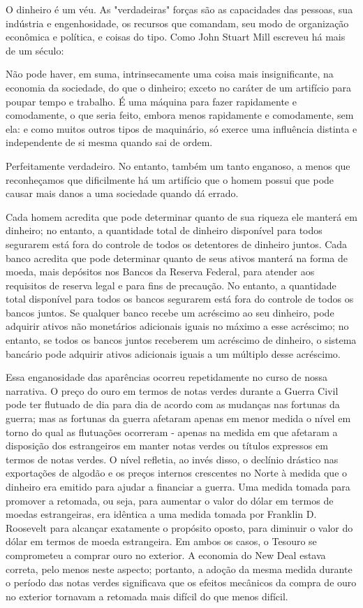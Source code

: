 \documentclass[12pt]{article}
\begin{document}
O dinheiro é um véu. As "verdadeiras" forças são as capacidades das pessoas, sua indústria e engenhosidade, os recursos que comandam, seu modo de organização econômica e política, e coisas do tipo. Como John Stuart Mill escreveu há mais de um século:

Não pode haver, em suma, intrinsecamente uma coisa mais insignificante, na economia da sociedade, do que o dinheiro; exceto no caráter de um artifício para poupar tempo e trabalho. É uma máquina para fazer rapidamente e comodamente, o que seria feito, embora menos rapidamente e comodamente, sem ela: e como muitos outros tipos de maquinário, só exerce uma influência distinta e independente de si mesma quando sai de ordem.

Perfeitamente verdadeiro. No entanto, também um tanto enganoso, a menos que reconheçamos que dificilmente há um artifício que o homem possui que pode causar mais danos a uma sociedade quando dá errado.

Cada homem acredita que pode determinar quanto de sua riqueza ele manterá em dinheiro; no entanto, a quantidade total de dinheiro disponível para todos segurarem está fora do controle de todos os detentores de dinheiro juntos. Cada banco acredita que pode determinar quanto de seus ativos manterá na forma de moeda, mais depósitos nos Bancos da Reserva Federal, para atender aos requisitos de reserva legal e para fins de precaução. No entanto, a quantidade total disponível para todos os bancos segurarem está fora do controle de todos os bancos juntos. Se qualquer banco recebe um acréscimo ao seu dinheiro, pode adquirir ativos não monetários adicionais iguais no máximo a esse acréscimo; no entanto, se todos os bancos juntos receberem um acréscimo de dinheiro, o sistema bancário pode adquirir ativos adicionais iguais a um múltiplo desse acréscimo.

Essa enganosidade das aparências ocorreu repetidamente no curso de nossa narrativa. O preço do ouro em termos de notas verdes durante a Guerra Civil pode ter flutuado de dia para dia de acordo com as mudanças nas fortunas da guerra; mas as fortunas da guerra afetaram apenas em menor medida o nível em torno do qual as flutuações ocorreram - apenas na medida em que afetaram a disposição dos estrangeiros em manter notas verdes ou títulos expressos em termos de notas verdes. O nível refletia, ao invés disso, o declínio drástico nas exportações de algodão e os preços internos crescentes no Norte à medida que o dinheiro era emitido para ajudar a financiar a guerra.
Uma medida tomada para promover a retomada, ou seja, para aumentar o valor do dólar em termos de moedas estrangeiras, era idêntica a uma medida tomada por Franklin D. Roosevelt para alcançar exatamente o propósito oposto, para diminuir o valor do dólar em termos de moeda estrangeira. Em ambos os casos, o Tesouro se comprometeu a comprar ouro no exterior.
A economia do New Deal estava correta, pelo menos neste aspecto; portanto, a adoção da mesma medida durante o período das notas verdes significava que os efeitos mecânicos da compra de ouro no exterior tornavam a retomada mais difícil do que menos difícil.
\end{document}
